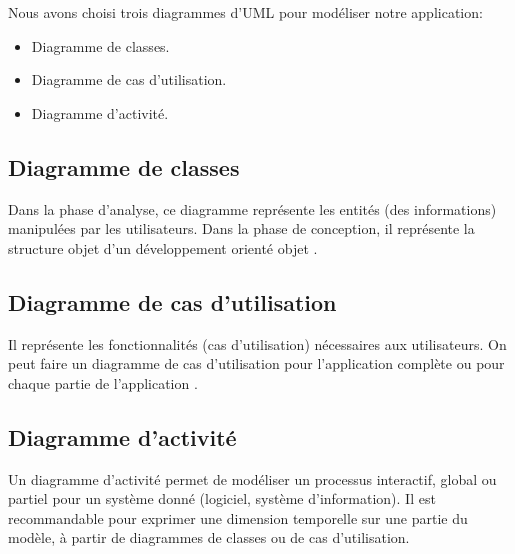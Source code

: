 \documentclass[french,a4,12pt]{report}
\begin{document}
Nous avons choisi trois diagrammes d’UML pour modéliser notre application:
\begin{itemize}%
	\item Diagramme de classes.
	\item Diagramme de cas d’utilisation.
	\item Diagramme d'activité.
\end{itemize}
\begin{tcolorbox}[colframe=green!75,rightrule=0.5cm,leftrule=0.5cm,]
 \subsection{Diagramme de classes}
\end{tcolorbox}
	Dans la phase d’analyse, ce diagramme représente les entités (des informations) manipulées par les utilisateurs. Dans la phase de conception, il représente la structure objet d’un développement orienté objet \cite{9}.
	\newpage
\begin{tcolorbox}[colframe=green!75,rightrule=0.5cm,leftrule=0.5cm,]
 \subsection{Diagramme de cas d’utilisation}
\end{tcolorbox}
Il représente les fonctionnalités (cas d’utilisation) nécessaires aux utilisateurs.
On peut faire un diagramme de cas d’utilisation pour l'application complète ou pour chaque partie de l'application \cite{9}.
\newpage
\begin{tcolorbox}[colframe=green!75,rightrule=0.5cm,leftrule=0.5cm,]
 \subsection{Diagramme d'activité}
\end{tcolorbox}
Un diagramme d'activité permet de modéliser un processus interactif, global ou partiel pour un système donné (logiciel, système d'information). Il est recommandable pour exprimer une dimension temporelle sur une partie du modèle, à partir de diagrammes de classes ou de cas d'utilisation.\\
\end{document}
